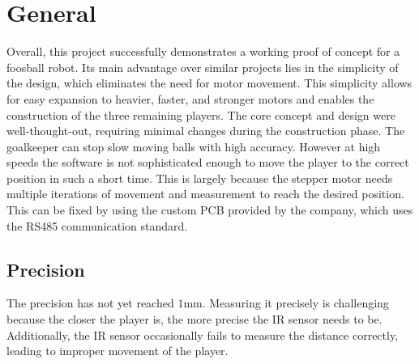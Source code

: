 \section{General}\label{sec:general4}
Overall, this project successfully demonstrates a working proof of concept for a foosball robot.
Its main advantage over similar projects lies in the simplicity of the design, which eliminates the need for motor movement.
This simplicity allows for easy expansion to heavier, faster, and stronger motors and enables the construction of the three remaining players.
The core concept and design were well-thought-out, requiring minimal changes during the construction phase.
The goalkeeper can stop slow moving balls with high accuracy.
However at high speeds the software is not sophisticated enough to move the player to the correct position in such a short time.
This is largely because the stepper motor needs multiple iterations of movement and measurement to reach the desired position.
This can be fixed by using the custom PCB provided by the company, which uses the RS485 communication standard.


\subsection{Precision}\label{subsec:precision}
The precision has not yet reached $1\mathrm{mm}$.
Measuring it precisely is challenging because the closer the player is, the more precise the IR sensor needs to be.
Additionally, the IR sensor occasionally fails to measure the distance correctly, leading to improper movement of the player.

